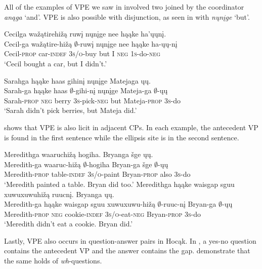 \documentclass[output=paper]{LSP/langsci}
\begin{document}
All of the examples of VPE we saw in  involved two  joined by the coordinator \emph{anąga} `and'. VPE is also possible with disjunction, as seen in  with \emph{nųnįge} `but'.
 
\ea\label{ex:johnson:26}
\ea 
\glll Cecilga wažątirehižą ruwį nųnįge nee hąąke ha'ųųnį.\\
Cecil-ga wažątire-hižą $\emptyset$-ruwį nųnįge nee hąąke ha-ųų-nį\\
Cecil-\textsc{prop} car-\textsc{indef} \textsc{3s/o}-buy but I \textsc{neg} \textsc{1s}-do-\textsc{neg}\\
\trans `Cecil bought a car, but I didn't.'

\ex 
\glll Sarahga hąąke haas gihinį nųnįge Matejaga ųų.\\
Sarah-ga hąąke haas $\emptyset$-gihi-nį nųnįge Mateja-ga $\emptyset$-ųų\\
Sarah-\textsc{prop} \textsc{neg} berry \textsc{3s}-pick-\textsc{neg} but Mateja-\textsc{prop} \textsc{3s}-do\\
\trans `Sarah didn't pick berries, but Mateja did.'
\z
\z


 shows that VPE is also licit in adjacent CPs. In each example, the antecedent VP is found in the first sentence while the ellipsis site is in the second sentence.
 
\ea\label{ex:johnson:27}
\ea 
\glll Meredithga waaruchižą hogiha. Bryanga šge ųų.\\
Meredith-ga waaruc-hižą $\emptyset$-hogiha Bryan-ga šge $\emptyset$-ųų\\
Meredith-\textsc{prop} table-\textsc{indef} \textsc{3s/o}-paint Bryan-\textsc{prop} also \textsc{3s}-do\\
\trans `Meredith painted a table. Bryan did too.'
\ex 
\glll Meredithga hąąke {waisgap sguu xuwuxuwuhižą} ruucnį. Bryanga ųų.\\
Meredith-ga hąąke {waisgap sguu xuwuxuwu-hižą} $\emptyset$-ruuc-nį Bryan-ga $\emptyset$-ųų\\
Meredith-\textsc{prop} \textsc{neg} cookie-\textsc{indef} \textsc{3s/o}-eat-\textsc{neg} Bryan-\textsc{prop} \textsc{3s}-do\\
\trans `Meredith didn't eat a cookie. Bryan did.'
\z
\z

 
Lastly, VPE also occurs in question-answer pairs in Hocąk. In , a yes-no question contains the antecedent VP and the answer contains the gap.  demonstrate that the same holds of \emph{wh}-questions.
 
\end{document}
